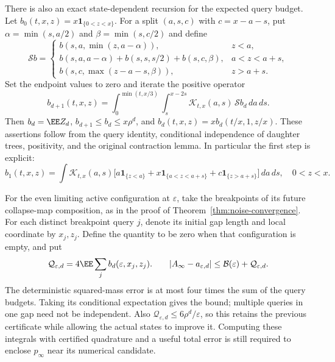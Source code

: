 \documentclass[11pt,letterpaper]{article}
\newcommand{\ind}{\mathbf 1}\newcommand{\Exp}{\operatorname{Exp}}
\begin{document}
There is also an exact state-dependent recursion for the expected query
budget. Let $b_0(t,x,z)=x\ind_{\{0<z<x\}}$.
For a split $(a,s,c)$ with $c=x-a-s$, put
$\alpha=\min(s,a/2)$ and $\beta=\min(s,c/2)$ and define
\[
 \mathcal S b=
 \begin{cases}
 b(s,a,\min(z,a-\alpha)),&z<a,\\
 b(s,a,a-\alpha)+b(s,s,s/2)+b(s,c,\beta),&a<z<a+s,\\
 b(s,c,\max(z-a-s,\beta)),&z>a+s.
 \end{cases}
\]
Set the endpoint values to zero and iterate the positive operator
\begin{equation}\label{eq:expected-query-recursion}
 b_{d+1}(t,x,z)=\int_0^{\min(t,x/3)}\int_s^{x-2s}
              \mathcal K_{t,x}(a,s)\,\mathcal S b_d\,da\,ds.
\end{equation}
Then $b_d=\EE Z_d$, $b_{d+1}\le b_d\le x\rho^d$, and
$b_d(t,x,z)=x b_d(t/x,1,z/x)$. These assertions follow from the query
identity, conditional independence of daughter trees, positivity, and
the original contraction lemma. In particular the first step is explicit:
\begin{equation}\label{eq:first-query-budget}
 b_1(t,x,z)=\int\mathcal K_{t,x}(a,s)
 \big[a\ind_{\{z<a\}}+x\ind_{\{a<z<a+s\}}
                  +c\ind_{\{z>a+s\}}\big]\,da\,ds,
 \quad 0<z<x.
\end{equation}

For the even limiting active configuration at $\varepsilon$, take the
breakpoints of its future collapse-map composition, as in the proof of
Theorem~\ref{thm:noise-convergence}. For each distinct breakpoint query
$j$, denote its initial gap length and local coordinate by $x_j,z_j$.
Define the quantity to be zero when that configuration is empty, and put
\begin{equation}\label{eq:adaptive-noise-budget}
 \mathcal Q_{\varepsilon,d}
 =4\EE\sum_j b_d(\varepsilon,x_j,z_j).
 \qquad
 |A_\infty-a_{\varepsilon,d}|
       \le\mathcal B(\varepsilon)+\mathcal Q_{\varepsilon,d}.
\end{equation}
The deterministic squared-mass error is at most four times the sum of
the query budgets. Taking its conditional expectation gives the bound;
multiple queries in one gap need not be independent. Also
$\mathcal Q_{\varepsilon,d}\le6\rho^d/\varepsilon$, so this retains the
previous certificate while allowing the actual states to improve it.
Computing these integrals with certified quadrature and a useful total
error is still required to enclose $p_\infty$ near its numerical candidate.
\end{document}

